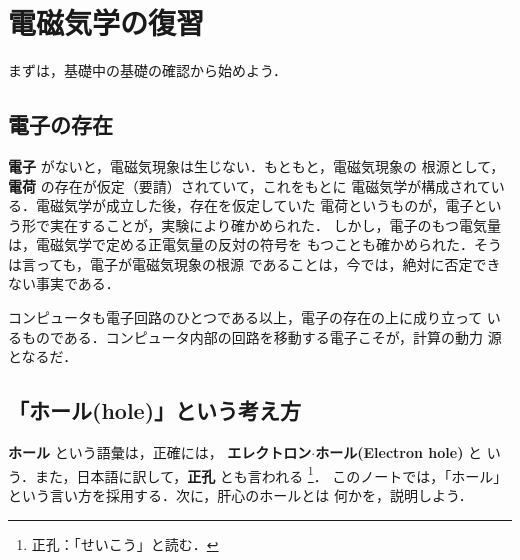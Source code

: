     \section{電磁気学の復習}
    \begin{mycomment}
        まずは，基礎中の基礎の確認から始めよう．
    \end{mycomment}
    \subsection{電子の存在}
    \textbf{電子} がないと，電磁気現象は生じない．もともと，電磁気現象の
    根源として，\textbf{電荷} の存在が仮定（要請）されていて，これをもとに
    電磁気学が構成されている．電磁気学が成立した後，存在を仮定していた
    電荷というものが，電子という形で実在することが，実験により確かめられた．
    しかし，電子のもつ電気量は，電磁気学で定める正電気量の反対の符号を
    もつことも確かめられた．そうは言っても，電子が電磁気現象の根源
    であることは，今では，絶対に否定できない事実である．

    コンピュータも電子回路のひとつである以上，電子の存在の上に成り立って
    いるものである．コンピュータ内部の回路を移動する電子こそが，計算の動力
    源となるだ．

    \subsection{「ホール(hole)」という考え方}
    \textbf{ホール} という語彙は，正確には，
    \textbf{エレクトロン$\cdot$ホール(Electron hole)} と
    いう．また，日本語に訳して，\textbf{正孔} とも言われる
        \footnote{
            正孔：「せいこう」と読む．
        }．
    このノートでは，「ホール」という言い方を採用する．次に，肝心のホールとは
    何かを，説明しよう．

